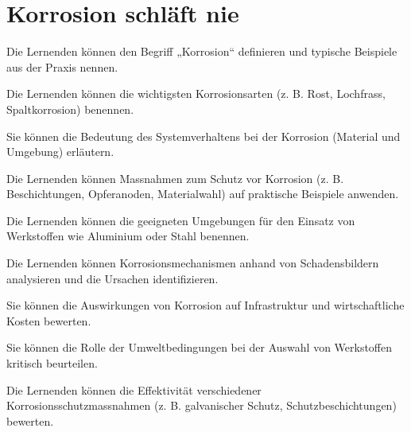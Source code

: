 %



\newcommand{\blattname}{Korrosion schläft nie}



\newcommand{\korrosionfrage}[2]{%
    \question #1
    \begin{solutionorbox}[#2]
    \end{solutionorbox}
}



\section*{\blattname}






\begin{questions}
    \korrosionfrage{Die Lernenden können den Begriff „Korrosion“ definieren und typische Beispiele aus der Praxis nennen.}{5cm}
    \korrosionfrage{Die Lernenden können die wichtigsten Korrosionsarten (z. B. Rost, Lochfrass, Spaltkorrosion) benennen.}{5cm}
    \korrosionfrage{Sie können die Bedeutung des Systemverhaltens bei der Korrosion (Material und Umgebung) erläutern.}{5cm}
    \pagebreakexam
    \korrosionfrage{Die Lernenden können Massnahmen zum Schutz vor Korrosion (z. B. Beschichtungen, Opferanoden, Materialwahl) auf praktische Beispiele anwenden.}{5cm}
    \korrosionfrage{Die Lernenden können die geeigneten Umgebungen für den Einsatz von Werkstoffen wie Aluminium oder Stahl benennen.}{5cm}
    \korrosionfrage{Die Lernenden können Korrosionsmechanismen anhand von Schadensbildern analysieren und die Ursachen identifizieren.}{5cm}
    \pagebreakexam
    \korrosionfrage{Sie können die Auswirkungen von Korrosion auf Infrastruktur und wirtschaftliche Kosten bewerten.}{5cm}
    \korrosionfrage{Sie können die Rolle der Umweltbedingungen bei der Auswahl von Werkstoffen kritisch beurteilen.}{5cm}
    \korrosionfrage{Die Lernenden können die Effektivität verschiedener Korrosionsschutzmassnahmen (z. B. galvanischer Schutz, Schutzbeschichtungen) bewerten.}{5cm}
    
\end{questions}




